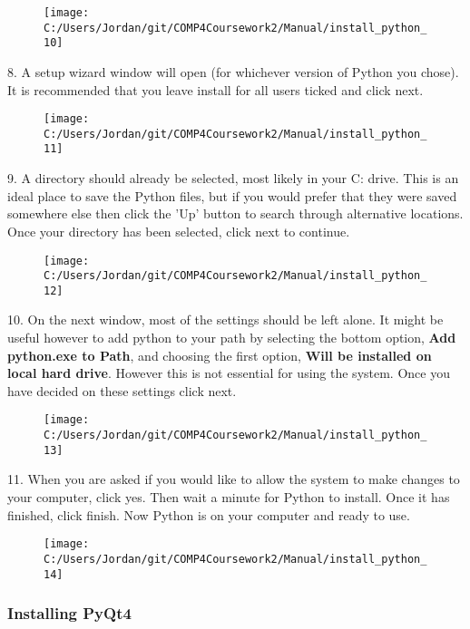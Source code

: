 \begin{figure}[H]
    \texttt{[image: C:/Users/Jordan/git/COMP4Coursework2/Manual/install\_python\_10]}
\end{figure}

8. A setup wizard window will open (for whichever version of Python you chose). It is recommended that you leave install for all users ticked and click next.

\begin{figure}[H]
    \texttt{[image: C:/Users/Jordan/git/COMP4Coursework2/Manual/install\_python\_11]}
\end{figure}

9. A directory should already be selected, most likely in your C: drive. This is an ideal place to save the Python files, but if you would prefer that they were saved somewhere else then click the 'Up' button to search through alternative locations. Once your directory has been selected, click next to continue.

\begin{figure}[H]
    \texttt{[image: C:/Users/Jordan/git/COMP4Coursework2/Manual/install\_python\_12]}
\end{figure}

10. On the next window, most of the settings should be left alone. It might be useful however to add python to your path by selecting the bottom option, \textbf{Add python.exe to Path}, and choosing the first option, \textbf{Will be installed on local hard drive}. However this is not essential for using the system. Once you have decided on these settings click next.

\begin{figure}[H]
    \texttt{[image: C:/Users/Jordan/git/COMP4Coursework2/Manual/install\_python\_13]}
\end{figure}

11. When you are asked if you would like to allow the system to make changes to your computer, click yes. Then wait a minute for Python to install. Once it has finished, click finish. Now Python is on your computer and ready to use.

\begin{figure}[H]
    \texttt{[image: C:/Users/Jordan/git/COMP4Coursework2/Manual/install\_python\_14]}
\end{figure}

\subsubsection{Installing PyQt4}

